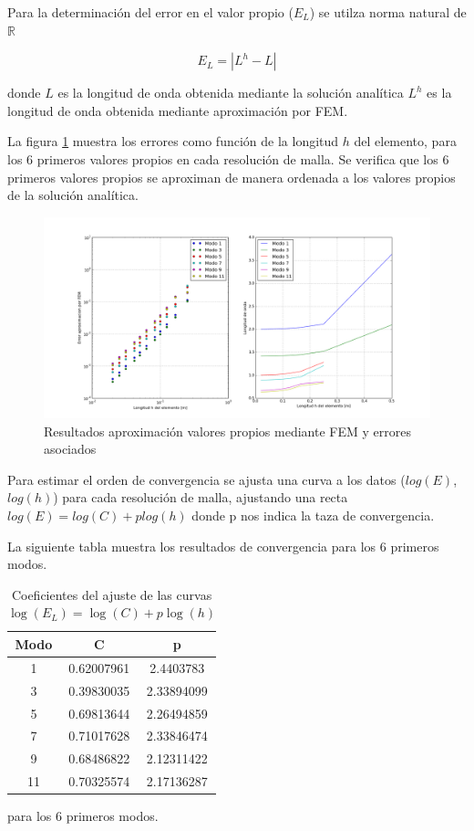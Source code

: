 Para la determinaci\'on del error en el valor propio ($E_L$) se utilza norma natural de $\mathbb{R}$

$$E_L = |L^h - L|$$

donde $L$ es la longitud de onda obtenida mediante la soluci\'on anal\'itica $L^h$ es la longitud de onda obtenida mediante aproximaci\'on por FEM.

La figura \ref{fig:valores_propios} muestra los errores como funci\'on de la longitud $h$ del elemento, para los 6 primeros valores propios en cada resoluci\'on de malla. Se verifica que los 6 primeros valores propios se aproximan de manera ordenada a los valores propios de la soluci\'on anal\'itica.

\begin{figure}
  \centering
  \includegraphics[width=17cm]{figuras/valores_propiosFEM.png}
  \caption{ Resultados aproximaci\'on valores propios mediante FEM y errores asociados}  
  \label{fig:valores_propios}
\end{figure}

Para estimar el orden de convergencia se ajusta una curva a los datos ($log(E)$, $log(h)$) para cada resoluci\'on de malla, ajustando una recta $log(E) = log(C) + p log(h)$ donde p nos indica la taza de convergencia.

La siguiente tabla muestra los resultados de convergencia para los 6 primeros modos.

\begin{table}[h]
\centering
\begin{tabular}{|c|c|c|}
\hline 
Modo & C & p \\ 
\hline 
1 & 0.62007961 & 2.4403783 \\
\hline 
3 & 0.39830035 & 2.33894099 \\ 
\hline 
5 & 0.69813644 & 2.26494859 \\  
\hline 
7 & 0.71017628 & 2.33846474 \\ 
\hline 
9 & 0.68486822 & 2.12311422 \\  
\hline 
11 &  0.70325574 & 2.17136287 \\
\hline 
\end{tabular} 
\caption{Coeficientes del ajuste de las curvas $\log(E_L)=\log(C)+p\log(h)$} para los 6 primeros modos.
\end{table}

